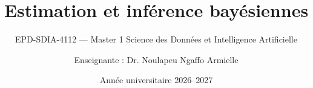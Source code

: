 
\title[Chapitre 3 --- Estimation et inférence bayésiennes]{Estimation et inférence bayésiennes}
\subtitle{EPD-SDIA-4112 --- Master 1 Science des Données et Intelligence Artificielle}
\author{Enseignante : Dr. Noulapeu Ngaffo Armielle}
\date{Année universitaire 2026--2027}





